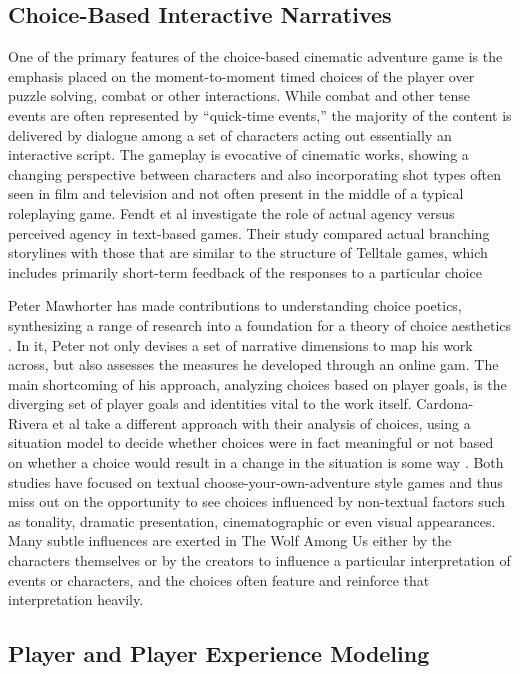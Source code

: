 \subsection{Choice-Based Interactive Narratives}
\label{sec:orgheadline5}
One of the primary features of the choice-based cinematic adventure game is the emphasis placed on the moment-to-moment timed choices of the player over puzzle solving, combat or other interactions. While combat and other tense events are often represented by “quick-time events,” the majority of the content is delivered by dialogue among a set of characters acting out essentially an interactive script. The gameplay is evocative of cinematic works, showing a changing perspective between characters and also incorporating shot types often seen in film and television and not often present in the middle of a typical roleplaying game. Fendt et al investigate the role of actual agency versus perceived agency in text-based games. Their study compared actual branching storylines with those that are similar to the structure of Telltale games, which includes primarily short-term feedback of the responses to a particular choice \cite{Fendt2012-xe}

Peter Mawhorter has made contributions to understanding choice
poetics, synthesizing a range of research into a foundation for a
theory of choice aesthetics \cite{Mawhorter2016-cx}. In it, Peter not
only devises a set of narrative dimensions to map his work across, but
also assesses the measures he developed through an online gam. The
main shortcoming of his approach, analyzing choices based on player
goals, is the diverging set of player goals and identities vital to
the work itself. Cardona-Rivera et al take a different approach with
their analysis of choices, using a situation model to decide whether
choices were in fact meaningful or not based on whether a choice would
result in a change in the situation is some way
\cite{Cardona-Rivera2014-ed}. Both studies have focused on textual
choose-your-own-adventure style games and thus miss out on the
opportunity to see choices influenced by non-textual factors such as
tonality, dramatic presentation, cinematographic or even visual
appearances. Many subtle influences are exerted in The Wolf Among Us
either by the characters themselves or by the creators to influence a
particular interpretation of events or characters, and the choices
often feature and reinforce that interpretation heavily.  
\subsection{Player and Player Experience Modeling}
\label{sec:orgheadline6}

